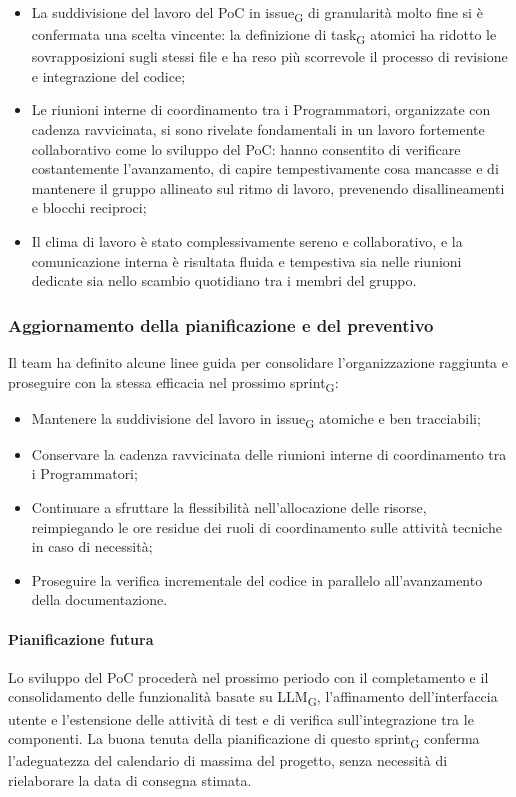 ﻿\documentclass[a4paper, 10pt, colorlinks=true, linkcolor=black, urlcolor=blue, citecolor=blue, hidelinks]{article}
\begin{document}
\begin{itemize}
    \item La suddivisione del lavoro del PoC in issue\textsubscript{G} di granularità molto fine si è confermata una scelta vincente: la definizione di task\textsubscript{G} atomici ha ridotto le sovrapposizioni sugli stessi file e ha reso più scorrevole il processo di revisione e integrazione del codice;
    \item Le riunioni interne di coordinamento tra i Programmatori, organizzate con cadenza ravvicinata, si sono rivelate fondamentali in un lavoro fortemente collaborativo come lo sviluppo del PoC: hanno consentito di verificare costantemente l'avanzamento, di capire tempestivamente cosa mancasse e di mantenere il gruppo allineato sul ritmo di lavoro, prevenendo disallineamenti e blocchi reciproci;
    \item Il clima di lavoro è stato complessivamente sereno e collaborativo, e la comunicazione interna è risultata fluida e tempestiva sia nelle riunioni dedicate sia nello scambio quotidiano tra i membri del gruppo.
\end{itemize}

\subsubsection{Aggiornamento della pianificazione e del preventivo}
Il team ha definito alcune linee guida per consolidare l'organizzazione raggiunta e proseguire con la stessa efficacia nel prossimo sprint\textsubscript{G}:
\begin{itemize}
    \item Mantenere la suddivisione del lavoro in issue\textsubscript{G} atomiche e ben tracciabili;
    \item Conservare la cadenza ravvicinata delle riunioni interne di coordinamento tra i Programmatori;
    \item Continuare a sfruttare la flessibilità nell'allocazione delle risorse, reimpiegando le ore residue dei ruoli di coordinamento sulle attività tecniche in caso di necessità;
    \item Proseguire la verifica incrementale del codice in parallelo all'avanzamento della documentazione.
\end{itemize}

\paragraph{Pianificazione futura}
Lo sviluppo del PoC procederà nel prossimo periodo con il completamento e il consolidamento delle funzionalità basate su LLM\textsubscript{G}, l'affinamento dell'interfaccia utente e l'estensione delle attività di test e di verifica sull'integrazione tra le componenti. La buona tenuta della pianificazione di questo sprint\textsubscript{G} conferma l'adeguatezza del calendario di massima del progetto, senza necessità di rielaborare la data di consegna stimata.
\end{document}
